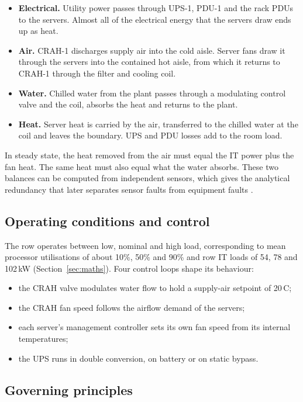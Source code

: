 \begin{itemize}
  \item \textbf{Electrical.} Utility power passes through UPS-1, PDU-1 and the rack PDUs to the servers. Almost all of the electrical energy that the servers draw ends up as heat.
  \item \textbf{Air.} CRAH-1 discharges supply air into the cold aisle. Server fans draw it through the servers into the contained hot aisle, from which it returns to CRAH-1 through the filter and cooling coil.
  \item \textbf{Water.} Chilled water from the plant passes through a modulating control valve and the coil, absorbs the heat and returns to the plant.
  \item \textbf{Heat.} Server heat is carried by the air, transferred to the chilled water at the coil and leaves the boundary. UPS and PDU losses add to the room load.
\end{itemize}

In steady state, the heat removed from the air must equal the IT power plus the fan heat. The same heat must also equal what the water absorbs. These two balances can be computed from independent sensors, which gives the analytical redundancy that later separates sensor faults from equipment faults \parencite{isermann2006}.

\subsection{Operating conditions and control}

The row operates between low, nominal and high load, corresponding to mean processor utilisations of about 10\%, 50\% and 90\% and row IT loads of 54, 78 and 102\,kW (Section~\ref{sec:maths}). Four control loops shape its behaviour:

\begin{itemize}
  \item the CRAH valve modulates water flow to hold a supply-air setpoint of 20\,\textdegree C;
  \item the CRAH fan speed follows the airflow demand of the servers;
  \item each server's management controller sets its own fan speed from its internal temperatures;
  \item the UPS runs in double conversion, on battery or on static bypass.
\end{itemize}

\subsection{Governing principles}

